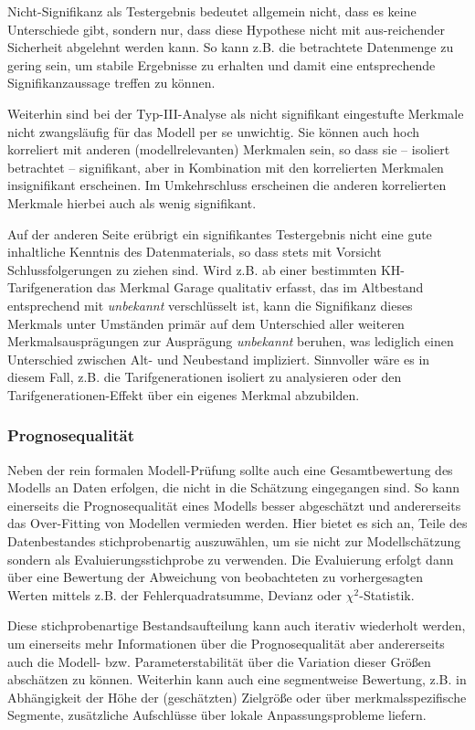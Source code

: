 Nicht-Signifikanz als Testergebnis bedeutet allgemein nicht, dass es keine Unterschiede gibt, sondern nur, dass diese Hypothese nicht mit aus-reichender Sicherheit abgelehnt werden kann. So kann z.B. die betrachtete Datenmenge zu gering sein, um stabile Ergebnisse zu erhalten und damit eine entsprechende Signifikanzaussage treffen zu können. 

Weiterhin sind bei der Typ-III-Analyse als nicht signifikant eingestufte Merkmale nicht zwangsläufig für das Modell per se unwichtig. Sie können auch hoch korreliert mit anderen (modellrelevanten) Merkmalen sein, so dass sie – isoliert betrachtet – signifikant, aber in Kombination mit den korrelierten Merkmalen insignifikant erscheinen. Im Umkehrschluss erscheinen die anderen korrelierten Merkmale hierbei auch als wenig signifikant.

Auf der anderen Seite erübrigt ein signifikantes Testergebnis nicht eine gute inhaltliche Kenntnis des Datenmaterials, so dass stets mit Vorsicht Schlussfolgerungen zu ziehen sind. Wird z.B. ab einer bestimmten KH-Tarifgeneration das Merkmal Garage qualitativ erfasst, das im Altbestand entsprechend mit \textit{unbekannt} verschlüsselt ist, kann die Signifikanz dieses Merkmals unter Umständen primär auf dem Unterschied aller weiteren Merkmalsausprägungen zur Ausprägung \textit{unbekannt} beruhen, was lediglich einen Unterschied zwischen Alt- und Neubestand impliziert. Sinnvoller wäre es in diesem Fall, z.B. die Tarifgenerationen isoliert zu analysieren oder den Tarifgenerationen-Effekt über ein eigenes Merkmal abzubilden.

\subsubsection{Prognosequalität}
 
Neben der rein formalen Modell-Prüfung sollte auch eine Gesamtbewertung des Modells an Daten erfolgen, die nicht in die Schätzung eingegangen sind. So kann einerseits die Prognosequalität eines Modells besser abgeschätzt und andererseits das Over-Fitting von Modellen vermieden werden. Hier bietet es sich an, Teile des Datenbestandes stichprobenartig auszuwählen, um sie nicht zur Modellschätzung sondern als Evaluierungsstichprobe zu verwenden. Die Evaluierung erfolgt dann über eine Bewertung der Abweichung von beobachteten zu vorhergesagten Werten mittels z.B. der Fehlerquadratsumme, Devianz oder $\chi^2$-Statistik.

Diese stichprobenartige Bestandsaufteilung kann auch iterativ wiederholt werden, um einerseits mehr Informationen über die Prognosequalität aber andererseits auch die Modell- bzw. Parameterstabilität über die Variation dieser Größen abschätzen zu können. Weiterhin kann auch eine segmentweise Bewertung, z.B. in Abhängigkeit der Höhe der (geschätzten) Zielgröße oder über merkmalsspezifische Segmente, zusätzliche Aufschlüsse über lokale Anpassungsprobleme liefern.

